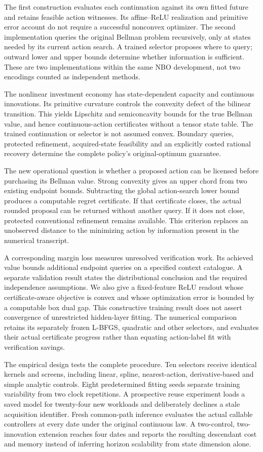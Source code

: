 \documentclass[ecta,nameyear,draft]{econsocart}
\begin{document}
The first construction evaluates each continuation against its own fitted future and retains feasible action witnesses. Its affine--ReLU realization and primitive error account do not require a successful nonconvex optimizer. The second implementation queries the original Bellman problem recursively, only at states needed by its current action search. A trained selector proposes where to query; outward lower and upper bounds determine whether information is sufficient. These are two implementations within the same NBO development, not two encodings counted as independent methods.

The nonlinear investment economy has state-dependent capacity and continuous innovations. Its primitive curvature controls the convexity defect of the bilinear transition. This yields Lipschitz and semiconcavity bounds for the true Bellman value, and hence continuous-action certificates without a tensor state table. The trained continuation or selector is not assumed convex. Boundary queries, protected refinement, acquired-state feasibility and an explicitly costed rational recovery determine the complete policy's original-optimum guarantee.

The new operational question is whether a proposed action can be licensed before purchasing its Bellman value. Strong convexity gives an upper chord from two existing endpoint bounds. Subtracting the global action-search lower bound produces a computable regret certificate. If that certificate closes, the actual rounded proposal can be returned without another query. If it does not close, protected conventional refinement remains available. This criterion replaces an unobserved distance to the minimizing action by information present in the numerical transcript.

A corresponding margin loss measures unresolved verification work. Its achieved value bounds additional endpoint queries on a specified context catalogue. A separate validation result states the distributional conclusion and the required independence assumptions. We also give a fixed-feature ReLU readout whose certificate-aware objective is convex and whose optimization error is bounded by a computable box dual gap. This constructive training result does not assert convergence of unrestricted hidden-layer fitting. The numerical comparison retains its separately frozen L-BFGS, quadratic and other selectors, and evaluates their actual certificate progress rather than equating action-label fit with verification savings.

The empirical design tests the complete procedure. Ten selectors receive identical kernels and screens, including linear, spline, nearest-action, derivative-based and simple analytic controls. Eight predetermined fitting seeds separate training variability from two clock repetitions. A prospective reuse experiment loads a saved model for twenty-four new workloads and deliberately declines a stale acquisition identifier. Fresh common-path inference evaluates the actual callable controllers at every date under the original continuous law. A two-control, two-innovation extension reaches four dates and reports the resulting descendant cost and memory instead of inferring horizon scalability from state dimension alone.
\end{document}
